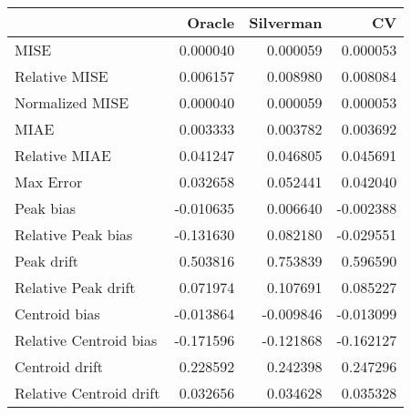 \begin{tabular}{lrrr}
  \hline
 & Oracle & Silverman & CV \\ 
  \hline
MISE & 0.000040 & 0.000059 & 0.000053 \\ 
  Relative MISE & 0.006157 & 0.008980 & 0.008084 \\ 
  Normalized MISE & 0.000040 & 0.000059 & 0.000053 \\ 
  MIAE & 0.003333 & 0.003782 & 0.003692 \\ 
  Relative MIAE & 0.041247 & 0.046805 & 0.045691 \\ 
  Max Error & 0.032658 & 0.052441 & 0.042040 \\ 
  Peak bias & -0.010635 & 0.006640 & -0.002388 \\ 
  Relative Peak bias & -0.131630 & 0.082180 & -0.029551 \\ 
  Peak drift & 0.503816 & 0.753839 & 0.596590 \\ 
  Relative Peak drift & 0.071974 & 0.107691 & 0.085227 \\ 
  Centroid bias & -0.013864 & -0.009846 & -0.013099 \\ 
  Relative Centroid bias & -0.171596 & -0.121868 & -0.162127 \\ 
  Centroid drift & 0.228592 & 0.242398 & 0.247296 \\ 
  Relative Centroid drift & 0.032656 & 0.034628 & 0.035328 \\ 
   \hline
\end{tabular}
